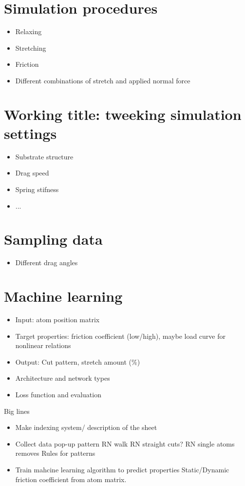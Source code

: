 \section*{Simulation procedures}
\begin{itemize}
  \item Relaxing
  \item Stretching 
  \item Friction 
  \item Different combinations of stretch and applied normal force
\end{itemize}

\section*{Working title: tweeking simulation settings} %
\begin{itemize}
  \item Substrate structure
  \item Drag speed
  \item Spring stifness
  \item ...
\end{itemize}

\section*{Sampling data}
\begin{itemize}
  \item Different drag angles
\end{itemize}

\section*{Machine learning}
\begin{itemize}
  \item Input: atom position matrix
  \item Target properties: friction coefficient (low/high), maybe load curve for nonlinear relations
  \item Output: Cut pattern, stretch amount (\%)
  \item Architecture and network types
  \item Loss function and evaluation
\end{itemize}



\newpage
Big lines
\begin{itemize}
    \item Make indexing system/ description of the sheet 
    \item Collect data 
    \subitem pop-up pattern
    \subitem RN walk 
    \subitem RN straight cuts?
    \subitem RN single atoms removes
    \subitem Rules for patterns
    \item Train mahcine learning algorithm to predict properties
    \subitem Static/Dynamic friction coefficient from atom matrix. 
\end{itemize}    


